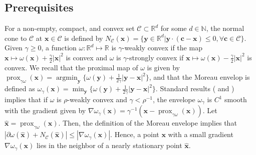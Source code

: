 \documentclass[10pt,reqno]{amsart}
\newcommand{\argmin}{\operatorname{argmin}}
\newcommand{\1}{{\chi}}
\def\leq{\leqslant}
\def\geq{\geqslant}
\numberwithin{equation}{section}
\theoremstyle{thmlemcorr}
\numberwithin{theorem}{section}
\theoremstyle{thmlemcorr*}
\theoremstyle{defi}
\theoremstyle{remexample}
\theoremstyle{ass}
\begin{document}
\subsection{Prerequisites}
\label{subsecPrere}
For a non-empty, compact, and convex set  $\mathcal{C}\subset \mathbb{R}^d$ for some $d\in \mathbb{N}$, the normal cone to $\mathcal{C}$ at $\boldsymbol{x}\in \mathcal{C}$ is defined by $N_{\mathcal{C}}(\boldsymbol{x}) = \{\boldsymbol{y}\in \mathbb{R}^d| \boldsymbol{y}\cdot (\boldsymbol{c} - \boldsymbol{x})\leq 0, \forall \boldsymbol{c}\in \mathcal{C} \}$. 
Given $\gamma\geq 0$, a function $\omega: \mathbb{R}^d\mapsto\mathbb{R}$ is $\gamma$-weakly convex if the map $\boldsymbol{x}\mapsto \omega(\boldsymbol{x})+\frac{\gamma}{2}|\boldsymbol{x}|^2$ is convex and  $\omega$ is $\gamma$-strongly convex if $\boldsymbol{x}\mapsto \omega(\boldsymbol{x})-\frac{\gamma}{2}|\boldsymbol{x}|^2$ is convex. We recall that the proximal map of $\omega$ is given by
	$\operatorname{prox}_{\gamma \omega}(\boldsymbol{x})=\argmin_{\boldsymbol{y}}\Big\{\omega(\boldsymbol{y})+\frac{1}{2\gamma}|\boldsymbol{y}-\boldsymbol{x}|^2 \Big\}$,
and that the Moreau envelop \cite{moreau1965proximite} is defined as  
	$\omega_{\gamma}(\boldsymbol{x})=\min_{\boldsymbol{y}}\Big\{\omega(\boldsymbol{y})+\frac{1}{2\gamma}|\boldsymbol{y}-\boldsymbol{x}|^2 \Big\}$. 
Standard results (\cite{moreau1965proximite} and  \cite[Theorem 31.5] {rockafellar1970convex}) implies that  if $\omega$ is $\rho$-weakly convex and $\gamma < \rho^{-1}$, the envelope $\omega_{\gamma}$ is $C^1$ smooth with the gradient given by
	$\nabla \omega_{\gamma}(\boldsymbol{x})=\gamma^{-1}(\boldsymbol{x}-\operatorname{prox}_{\gamma \omega}(\boldsymbol{x}))$. 
Let $\hat{\boldsymbol{x}}=\operatorname{prox}_{\gamma \omega}(\boldsymbol{x})$. Then, the definition of the Moreau envelope implies that 
	$|\partial \omega(\hat{\boldsymbol{x}}) + N_{\mathcal{C}}(\hat{\boldsymbol{x}})| \leq |\nabla \omega_{\gamma}(\boldsymbol{x})|$. Hence, a point $\boldsymbol{x}$ with a small gradient $\nabla \omega_{\gamma}(\boldsymbol{x})$ lies in the neighbor of a nearly stationary point $\hat{\boldsymbol{x}}$. 

\begin{comment}
	The key construction we rely on is the Moreau envelope defined in \eqref{nlmorlevp}. Lemma \ref{nlreprelm} shows that solving \eqref{nltlprob} is equivalent to minimizing $\psi$ defined by \eqref{nldefpsi}. For some $\rho>0$, let $\varphi_{1/\rho}$ be defined as in \eqref{nlmorlevp}. Then, the authors in \cite{davis2019stochastic}  show that 
	\begin{align}
		\label{lstbcd}
		|\partial \psi(\hat{\boldsymbol{z}}) + N_{\mathcal{X}}(\hat{\boldsymbol{z}})| \leq |\nabla \varphi_{1/\rho}(\boldsymbol{z})|.
	\end{align}
	Thus, \eqref{nlgcmf} and \eqref{lstbcd} imply that a point $\boldsymbol{z}$ with a small gradient $|\nabla \varphi_{1/\rho}(\boldsymbol{z})|$ lies in the neighbor of a nearly stationary point $\hat{\boldsymbol{z}}$. In the following of this section, we seek to bound $|\nabla \varphi_{1/\rho}(\hat{\boldsymbol{z}}^k)|$ where we recall that $(\hat{u}^k, \hat{\boldsymbol{z}}^k)= \widetilde{\operatorname{prox}}_{\varphi/\rho}(\boldsymbol{z}^k)$. 
\end{comment}
\end{document}
